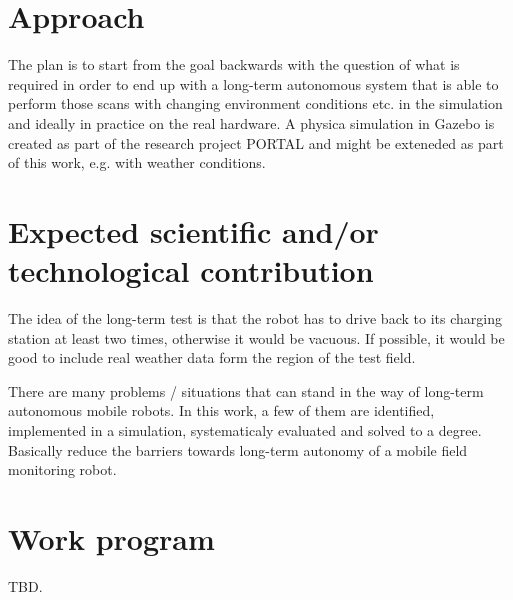 \documentclass[german, master, expose, latin1]{base/thesis_KBS}
\begin{document}
\section{Approach}

The plan is to start from the goal backwards with the question of what is required in order to end up with a long-term autonomous system that is
able to perform those scans with changing environment conditions etc. in the simulation and ideally in practice on the real hardware.
A physica simulation in Gazebo is created as part of the research project PORTAL and might be exteneded as part of this work, e.g. with weather conditions.

\section{Expected scientific and/or technological contribution}

The idea of the long-term test is that the robot has to drive back to its charging station at least two times, otherwise it would be vacuous.
If possible, it would be good to include real weather data form the region of the test field.\newline

There are many problems / situations that can stand in the way of long-term autonomous mobile robots. In this work, a few of them are identified,
implemented in a simulation, systematicaly evaluated and solved to a degree. Basically reduce the barriers towards long-term autonomy of a mobile field
monitoring robot.

\section{Work program}

TBD.


\end{document}
